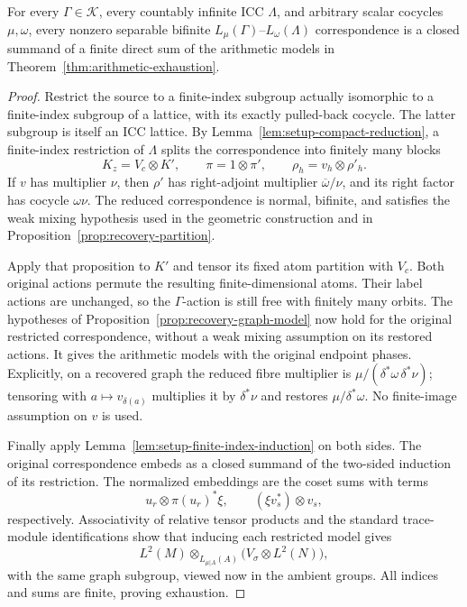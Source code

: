 \begin{proposition}
\label{prop:recovery-exhaustion}
For every $\Gamma\in\mathscr K$, every countably infinite ICC
$\Lambda$, and arbitrary scalar cocycles $\mu,\omega$, every nonzero
separable bifinite $L_\mu(\Gamma)$--$L_\omega(\Lambda)$ correspondence
is a closed summand of a finite direct sum of the arithmetic models in
Theorem~\ref{thm:arithmetic-exhaustion}.
\end{proposition}

\begin{proof}
Restrict the source to a finite-index subgroup actually isomorphic to a
finite-index subgroup of a lattice, with its exactly pulled-back
cocycle.  The latter subgroup is itself an ICC lattice.  By
Lemma~\ref{lem:setup-compact-reduction}, a finite-index restriction of
$\Lambda$ splits the correspondence into finitely many blocks
\[
 K_z=V_c\otimes K',\qquad
 \pi=1\otimes\pi',\qquad
 \rho_h=v_h\otimes\rho'_h.
\]
If $v$ has multiplier $\nu$, then $\rho'$ has right-adjoint multiplier
$\overline\omega/\nu$, and its right factor has cocycle $\omega\nu$.
The reduced correspondence is normal, bifinite, and satisfies the weak
mixing hypothesis used in the geometric construction and in
Proposition~\ref{prop:recovery-partition}.

Apply that proposition to $K'$ and tensor its fixed atom partition with
$V_c$.  Both original actions permute the resulting finite-dimensional
atoms.  Their label actions are unchanged, so the $\Gamma$-action is
still free with finitely many orbits.  The hypotheses of
Proposition~\ref{prop:recovery-graph-model} now hold for the original
restricted correspondence, without a weak mixing assumption on its
restored actions.  It gives the arithmetic models with the original
endpoint phases.  Explicitly, on a recovered graph the reduced fibre
multiplier is
$\mu/(\delta^*\omega\,\delta^*\nu)$; tensoring with
$a\mapsto v_{\delta(a)}$ multiplies it by $\delta^*\nu$ and restores
$\mu/\delta^*\omega$.  No finite-image assumption on $v$ is used.

Finally apply Lemma~\ref{lem:setup-finite-index-induction} on both sides.
The original correspondence embeds as a closed summand of the two-sided
induction of its restriction.  The normalized embeddings are the coset
sums with terms
\[
 u_r\otimes\pi(u_r)^*\xi,
 \qquad
 (\xi v_s^*)\otimes v_s,
\]
respectively.  Associativity of relative tensor products and the standard
trace-module identifications show that inducing each restricted model
gives
\[
 L^2(M)\otimes_{L_{\mu|A}(A)}
       \bigl(V_\sigma\otimes L^2(N)\bigr),
\]
with the same graph subgroup, viewed now in the ambient groups.  All
indices and sums are finite, proving exhaustion.
\end{proof}

